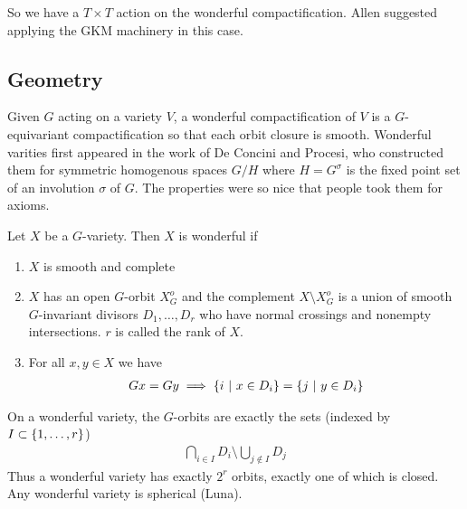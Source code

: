 \documentclass[12pt]{article}
\begin{document}
So we have a $T\times T$ action on the wonderful compactification. Allen suggested applying the GKM machinery in this case.

\subsection{Geometry}
Given $G$ acting on a variety $V$, a wonderful compactification of $V$ is a $G$-equivariant compactification so that each orbit closure is smooth.
Wonderful varities first appeared in the work of De Concini and Procesi, who constructed them for symmetric homogenous spaces $G/H$ where $H = G^\sigma$ is the fixed point set of an involution $\sigma$ of $G$.
The properties were so nice that people took them for axioms.

\begin{definition}
    Let $X$ be a $G$-variety. Then $X$ is wonderful if \begin{enumerate}
        \item $X$ is smooth and complete
        \item $X$ has an open $G$-orbit $X_G^o$ and the complement $X\setminus X_G^o$ is a union of smooth $G$-invariant divisors $D_1,\dots,D_r$ who have normal crossings and nonempty intersections.
        $r$ is called the rank of $X$.
        \item For all $x,y\in X$ we have \begin{align*}
            Gx = Gy \implies \{i\ \vert \  x\in D_i\} = \{j\ \vert \  y\in D_i\}
        \end{align*}
    \end{enumerate}
\end{definition}
On a wonderful variety, the $G$-orbits are exactly the sets (indexed by $I\subset\{1,\dots,r\}$)
\begin{align*}
    \bigcap_{i\in I}D_i \setminus \bigcup_{j\notin I}D_j
\end{align*} Thus a wonderful variety has exactly $2^r$ orbits, exactly one of which is closed. Any wonderful variety is spherical (Luna).
\end{document}
